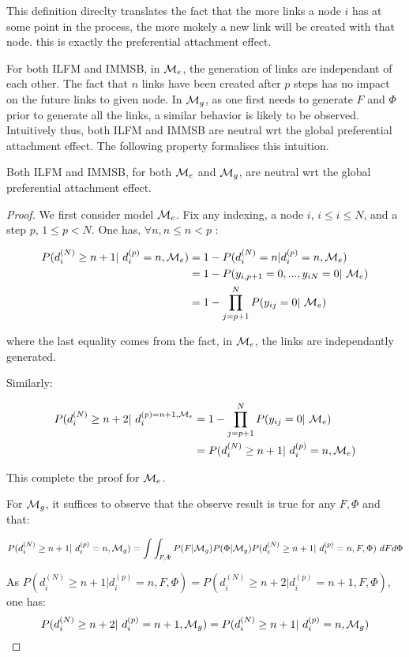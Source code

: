 This definition direclty translates the fact that the more links a node $i$ has at some point in the process, the more mokely a new link will be created with that node. this is exactly the preferential attachment effect.

For both ILFM and IMMSB, in $\mathcal{M}_e$, the generation of links are independant of each other. The fact that $n$ links have been created after $p$ steps has no impact on the future links to given node. In $\mathcal{M}_g$, as one first needs to generate $F$ and $\Phi$ prior to generate all the links, a similar behavior is likely to be observed. Intuitively thus, both ILFM and IMMSB are neutral wrt the global preferential attachment effect. The following property formalises this intuition.


\begin{proposition} \label{th:mg_glob}
Both ILFM and IMMSB, for both $\mathcal{M}_e$ and $\mathcal{M}_g$, are neutral wrt the global preferential attachment effect.
\end{proposition}

\begin{proof}
We first consider model $\mathcal{M}_e$. Fix any indexing, a node $i$, $i \leq i \leq N$, and a step $p$, $1 \leq p < N$. One has, $\forall n, n \leq n < p$ :

\begin{align*}
P(d_i^{(N)} \geq n+1 | d_i^{(p)}=n, \M_e) &= 1 - P(d_i^{(N)}=n | d_i^{(p)}=n, \M_e) \\
        &= 1 -P(y_{i,p+1}=0, ...,y_{iN}=0 | \M_e ) \\
        &= 1 - \prod_{j=p+1}^N P(y_{ij}=0 | \M_e)
\end{align*}

where the last equality comes from the fact, in $\mathcal{M}_e$, the links are independantly generated.

Similarly:

\begin{align*}
P(d_i^{(N)} \geq n+2 | d_i^{(p)=n+1, \M_e} &= 1 - \prod_{j=p+1}^N P(y_{ij}=0 | \M_e) \\
                    &=P(d_i^{(N)} \geq n+1 | d_i^{(p)}=n, \M_e)
\end{align*}

This complete the proof for $\mathcal{M}_e$.

For $\mathcal{M}_g$, it suffices to observe that the observe result is true for any $F, \Phi$ and that:

\begin{equation*}
P(d_i^{(N)} \geq n+1 | d_i^{(p)}=n, \M_g)  = \int\int_{F,\Phi} P(F|\M_g)P(\Phi|\M_g) P(d_i^{(N)} \geq n+1 | d_i^{(p)}=n, F, \Phi) \ dF d\Phi
\end{equation*}

As $P(d_i^{(N)} \geq n+1 | d_i^{(p)}=n, F, \Phi) = P(d_i^{(N)} \geq n+2 | d_i^{(p)}=n+1, F, \Phi)$, one has:
\begin{equation*}
P(d_i^{(N)} \geq n+2 | d_i^{(p)}=n+1, \M_g) = P(d_i^{(N)} \geq n+1 | d_i^{(p)}=n, \M_g)
\end{equation*}

\end{proof}


